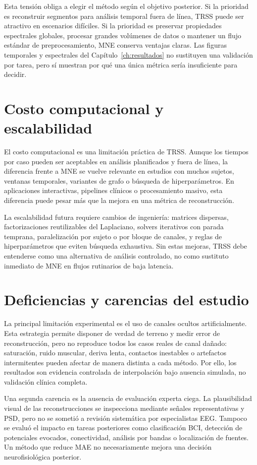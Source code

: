 Esta tensión obliga a elegir el método según el objetivo posterior. Si la prioridad es reconstruir segmentos para análisis temporal fuera de línea, TRSS puede ser atractivo en escenarios difíciles. Si la prioridad es preservar propiedades espectrales globales, procesar grandes volúmenes de datos o mantener un flujo estándar de preprocesamiento, MNE conserva ventajas claras. Las figuras temporales y espectrales del Capítulo~\ref{ch:resultados} no sustituyen una validación por tarea, pero sí muestran por qué una única métrica sería insuficiente para decidir.

\section{Costo computacional y escalabilidad}

El costo computacional es una limitación práctica de TRSS. Aunque los tiempos por caso pueden ser aceptables en análisis planificados y fuera de línea, la diferencia frente a MNE se vuelve relevante en estudios con muchos sujetos, ventanas temporales, variantes de grafo o búsqueda de hiperparámetros. En aplicaciones interactivas, pipelines clínicos o procesamiento masivo, esta diferencia puede pesar más que la mejora en una métrica de reconstrucción.

La escalabilidad futura requiere cambios de ingeniería: matrices dispersas, factorizaciones reutilizables del Laplaciano, solvers iterativos con parada temprana, paralelización por sujeto o por bloque de canales, y reglas de hiperparámetros que eviten búsqueda exhaustiva. Sin estas mejoras, TRSS debe entenderse como una alternativa de análisis controlado, no como sustituto inmediato de MNE en flujos rutinarios de baja latencia.

\section{Deficiencias y carencias del estudio}

La principal limitación experimental es el uso de canales ocultos artificialmente. Esta estrategia permite disponer de verdad de terreno y medir error de reconstrucción, pero no reproduce todos los casos reales de canal dañado: saturación, ruido muscular, deriva lenta, contactos inestables o artefactos intermitentes pueden afectar de manera distinta a cada método. Por ello, los resultados son evidencia controlada de interpolación bajo ausencia simulada, no validación clínica completa.

Una segunda carencia es la ausencia de evaluación experta ciega. La plausibilidad visual de las reconstrucciones se inspecciona mediante señales representativas y PSD, pero no se sometió a revisión sistemática por especialistas EEG. Tampoco se evaluó el impacto en tareas posteriores como clasificación BCI, detección de potenciales evocados, conectividad, análisis por bandas o localización de fuentes. Un método que reduce MAE no necesariamente mejora una decisión neurofisiológica posterior.

